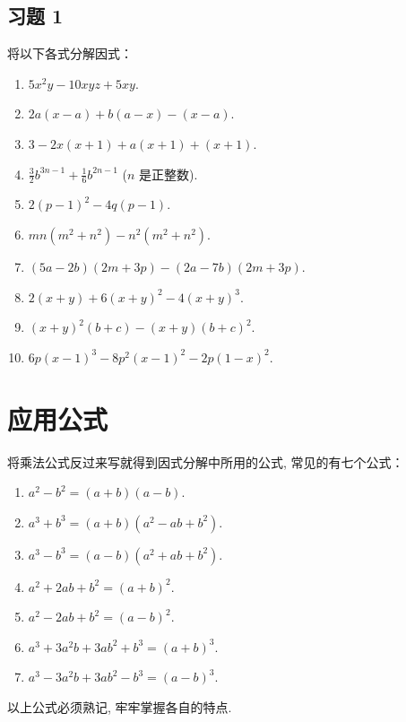 \subsection*{习题 1}
将以下各式分解因式：
\begin{enumerate}
	\item $5 x^{2} y-10 x y z+5 x y$.
	\item $2 a(x-a)+b(a-x)-(x-a)$.
	\item $3-2 x(x+1)+a(x+1)+(x+1)$.
	\item $\frac{3}{2} b^{3 n-1}+\frac{1}{6} b^{2 n-1}$ ($n$ 是正整数).
	\item $2(p-1)^{2}-4 q(p-1)$.
	\item $m n\left(m^{2}+n^{2}\right)-n^{2}\left(m^{2}+n^{2}\right)$.
	\item $(5 a-2 b)(2 m+3 p)-(2 a-7 b)(2 m+3 p)$.
	\item $2(x+y)+6(x+y)^{2}-4(x+y)^{3}$.
	\item $(x+y)^{2}(b+c)-(x+y)(b+c)^{2}$.
	\item $6 p(x-1)^{3}-8 p^{2}(x-1)^{2}-2 p(1-x)^{2}$.
\end{enumerate}

\section{应用公式}
将乘法公式反过来写就得到因式分解中所用的公式, 常见的有七个公式：
\begin{enumerate}
	\item $a^{2}-b^{2}=(a+b)(a-b)$.
	\item $a^{3}+b^{3}=(a+b)\left(a^{2}-a b+b^{2}\right)$.
	\item $a^{3}-b^{3}=(a-b)\left(a^{2}+a b+b^{2}\right)$.
	\item $a^{2}+2 a b+b^{2}=(a+b)^{2}$.
	\item $a^{2}-2 a b+b^{2}=(a-b)^{2}$.
	\item $a^{3}+3 a^{2} b+3 a b^{2}+b^{3}=(a+b)^{3}$.
	\item $a^{3}-3 a^{2} b+3 a b^{2}-b^{3}=(a-b)^{3}$.
\end{enumerate}
以上公式必须熟记, 牢牢掌握各自的特点.

